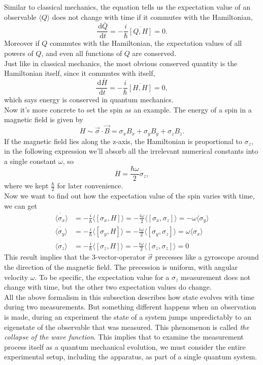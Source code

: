 \documentclass{article}
\newcommand{\be}{\begin{equation}}
\newcommand{\ee}{\end{equation}}
\newcommand{\dif}{\,\mathrm{d}}
\newcommand{\1}{\left}
\newcommand{\2}{\right}
\newcommand{\la}{\langle}
\newcommand{\ra}{\rangle}
\newcommand{\sig}{\sigma}
\newcommand{\om}{\omega}
\begin{document}
Similar to classical mechanics, the equation tells us the expectation value of an observable $\la Q\ra$  does not change with time if it commutes with the Hamiltonian,
\be
\frac{\dif\bar Q}{\dif t}=-\frac i \hbar\overline{[Q,H]} =0.
\ee
Moreover if $Q$ commutes with the Hamiltonian, the expectation values of all powers of $Q$, and even all functions of $Q$ are conserved.\\
Just like in classical mechanics, the most obvious conserved quantity is the Hamiltonian itself, since it commutes with itself,
\be
\frac{\dif\bar H}{\dif t}=-\frac i \hbar\overline{[H,H]}=0,
\ee
which says energy is conserved in quantum mechanics.\\

Now it's more concrete to set the spin as an example. The energy of a spin in a magnetic field is given by
\be
H\sim \vec\sig\cdot\vec B=\sig_x B_x+\sig_y B_y+\sig_z B_z.
\ee
If the magnetic field lies along the z-axis, the Hamiltonian is proportional to $\sig_z$, in the following expression we'll absorb all the irrelevant numerical constants into a single constant $\omega$, so
\be 
H=\frac{\hbar\omega}{2} \sig_z,
\ee
where we kept $\frac\hbar 2$ for later convenience.\\
Now we want to find out how the expectation value of the spin varies with time, we can get
\be\begin{split}
\dot{\la\sig_x\ra}&=-\frac i \hbar \la[\sig_x,H]\ra=-\frac{i\omega} 2\la[\sig_x,\sig_z]\ra=-\om\la\sig_y\ra\\
\dot{\la\sig_y\ra}&=-\frac i \hbar \la[\sig_y,H]\ra=-\frac{i\omega} 2\la[\sig_y,\sig_z]\ra=\om\la\sig_x\ra\\
\dot{\la\sig_z\ra}&=-\frac i \hbar \la[\sig_z,H]\ra=-\frac{i\omega} 2\la[\sig_z,\sig_z]\ra=0
\end{split}\ee
This result implies that the 3-vector-operator $\vec\sig$ precesses like a gyroscope around the direction of the magnetic field. The precession is uniform, with angular velocity $\om$. To be specific, the expectation value for a $\sig_z$ measurement does not change with time, but the other two expectation values do change.\\

All the above formalism in this subsection describes how state evolves with time during two measurements. But something different happens when an observation is made, during an experiment the state of a system jumps unpredictably to an eigenstate of the observable that was measured. This phenomenon is called \textit{the collapse of the wave function}. This implies that to examine the measurement process itself as a quantum mechanical evolution, we must consider the entire experimental setup, including the apparatus, as part of a single quantum system.
\end{document}
